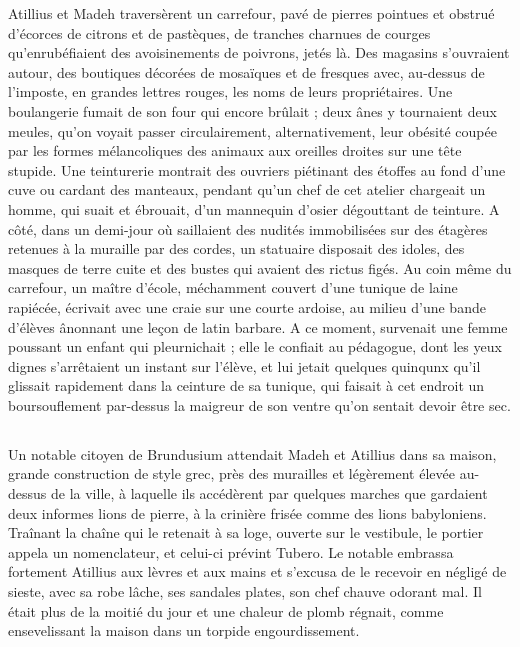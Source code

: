 \documentclass[a4paper, 11pt, oneside, polutonikogreek, french]{article}
\begin{document}
Atillius et Madeh traversèrent un carrefour, pavé de pierres pointues et obstrué d'écorces de citrons et de pastèques, de tranches charnues de courges qu'enrubéfiaient des avoisinements de poivrons, jetés là. Des magasins s'ouvraient autour, des boutiques décorées de mosaïques et de fresques avec, au-dessus de l'imposte, en grandes lettres rouges, les noms de leurs propriétaires. Une boulangerie fumait de son four qui encore brûlait ; deux ânes y tournaient deux meules, qu'on voyait passer circulairement, alternativement, leur obésité coupée par les formes mélancoliques des animaux aux oreilles droites sur une tête stupide. Une teinturerie montrait des ouvriers piétinant des étoffes au fond d'une cuve ou cardant des manteaux, pendant qu'un chef de cet atelier chargeait un homme, qui suait et ébrouait, d'un mannequin d'osier dégouttant de teinture. A côté, dans un demi-jour où saillaient des nudités immobilisées sur des étagères retenues à la muraille par des cordes, un statuaire disposait des idoles, des masques de terre cuite et des bustes qui avaient des rictus figés. Au coin même du carrefour, un maître d'école, méchamment couvert d'une tunique de laine rapiécée, écrivait avec une craie sur une courte ardoise, au milieu d'une bande d'élèves ânonnant une leçon de latin barbare. A ce moment, survenait une femme poussant un enfant qui pleurnichait ; elle le confiait au pédagogue, dont les yeux dignes s'arrêtaient un instant sur l'élève, et lui jetait quelques quinqunx qu'il glissait rapidement dans la ceinture de sa tunique, qui faisait à cet endroit un boursouflement par-dessus la maigreur de son ventre qu'on sentait devoir être sec.
\clearpage
\subsection{}
\paragraph{}
Un notable citoyen de Brundusium attendait Madeh et Atillius dans sa maison, grande construction de style grec, près des murailles et légèrement élevée au-dessus de la ville, à laquelle ils accédèrent par quelques marches que gardaient deux informes lions de pierre, à la crinière frisée comme des lions babyloniens. Traînant la chaîne qui le retenait à sa loge, ouverte sur le vestibule, le portier appela un nomenclateur, et celui-ci prévint Tubero. Le notable embrassa fortement Atillius aux lèvres et aux mains et s'excusa de le recevoir en négligé de sieste, avec sa robe lâche, ses sandales plates, son chef chauve odorant mal. Il était plus de la moitié du jour et une chaleur de plomb régnait, comme ensevelissant la maison dans un torpide engourdissement.
\end{document}
